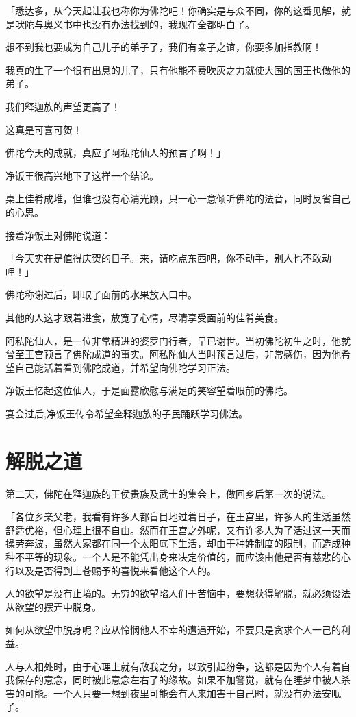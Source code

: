 \documentclass[twoside,openany]{book}
\begin{document}
「悉达多，从今天起让我也称你为佛陀吧！你确实是与众不同，你的这番见解，就是吠陀与奥义书中也没有办法找到的，我现在全都明白了。

想不到我也要成为自己儿子的弟子了，我们有亲子之谊，你要多加指教啊！

我真的生了一个很有出息的儿子，只有他能不费吹灰之力就使大国的国王也做他的弟子。

我们释迦族的声望更高了！

这真是可喜可贺！

佛陀今天的成就，真应了阿私陀仙人的预言了啊！」

净饭王很高兴地下了这样一个结论。

桌上佳肴成堆，但谁也没有心清光顾，只一心一意倾听佛陀的法音，同时反省自己的心思。

接着净饭王对佛陀说道：

「今天实在是值得庆贺的日子。来，请吃点东西吧，你不动手，别人也不敢动哩！」

佛陀称谢过后，即取了面前的水果放入口中。

其他的人这才跟着进食，放宽了心情，尽清享受面前的佳肴美食。

阿私陀仙人，是一位非常精进的婆罗门行者，早已谢世。当初佛陀初生之时，他就曾至王宫预言了佛陀成道的事实。阿私陀仙人当时预言过后，非常感伤，因为他希望自己能活着看到佛陀成道，并希望向佛陀学习正法。

净饭王忆起这位仙人，于是面露欣慰与满足的笑容望着眼前的佛陀。

宴会过后,净饭王传令希望全释迦族的子民踊跃学习佛法。

\section{解脱之道}\label{sec8.4}

第二天，佛陀在释迦族的王侯贵族及武士的集会上，做回乡后第一次的说法。

「各位乡亲父老，我看有许多人都盲目地过着日子，在王宫里，许多人的生活虽然舒适优裕，但心理上很不自由。然而在王宫之外呢，又有许多人为了活过这一天而操劳奔波，虽然大家都在同一个太阳底下生活，却由于种姓制度的限制，而造成种种不平等的现象。一个人是不能凭出身来决定价值的，而应该由他是否有慈悲的心行以及是否得到上苍赐予的喜悦来看他这个人的。

人的欲望是没有止境的。无穷的欲望陷人们于苦恼中，要想获得解脱，就必须设法从欲望的摆弄中脱身。

如何从欲望中脱身呢？应从怜悯他人不幸的遭遇开始，不要只是贪求个人一己的利益。

人与人相处时，由于心理上就有敌我之分，以致引起纷争，这都是因为个人有着自我保存的意念，同时被此意念左右了的缘故。如果不加警觉，就有在睡梦中被人杀害的可能。一个人只要一想到夜里可能会有人来加害于自己时，就没有办法安眠了。
\end{document}
